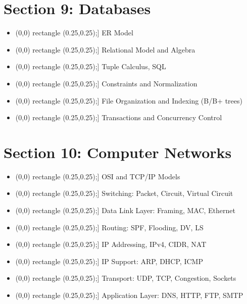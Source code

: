 \documentclass[14pt]{extarticle}
\newcommand{\checkbox}{\tikz\draw[thick] (0,0) rectangle (0.25,0.25);}
\newcommand{\topicitem}[1]{\item[\checkbox] #1}
\begin{document}
\section*{Section 9: Databases}
\begin{itemize}[leftmargin=1.5cm]
  \topicitem{ER Model}
  \topicitem{Relational Model and Algebra}
  \topicitem{Tuple Calculus, SQL}
  \topicitem{Constraints and Normalization}
  \topicitem{File Organization and Indexing (B/B+ trees)}
  \topicitem{Transactions and Concurrency Control}
\end{itemize}

\section*{Section 10: Computer Networks}
\begin{itemize}[leftmargin=1.5cm]
  \topicitem{OSI and TCP/IP Models}
  \topicitem{Switching: Packet, Circuit, Virtual Circuit}
  \topicitem{Data Link Layer: Framing, MAC, Ethernet}
  \topicitem{Routing: SPF, Flooding, DV, LS}
  \topicitem{IP Addressing, IPv4, CIDR, NAT}
  \topicitem{IP Support: ARP, DHCP, ICMP}
  \topicitem{Transport: UDP, TCP, Congestion, Sockets}
  \topicitem{Application Layer: DNS, HTTP, FTP, SMTP}
\end{itemize}
\end{document}
